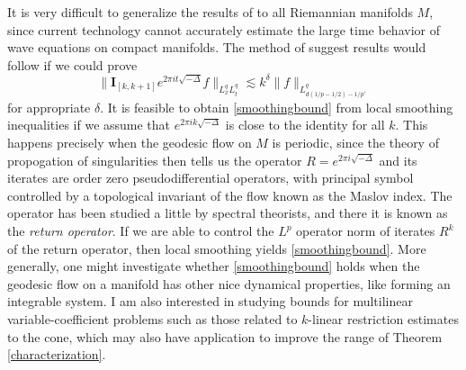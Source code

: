 \documentclass[11pt]{article}
\theoremstyle{definition}
\begin{document}

It is very difficult to generalize the results of \cite{DensonCharacterization} to all Riemannian manifolds $M$, since current technology cannot accurately estimate the large time behavior of wave equations on compact manifolds. The method of \cite{DensonCharacterization} suggest results would follow if we could prove
%
\begin{equation} \label{smoothingbound}
    \| \mathbf{I}_{[k,k+1]} e^{2 \pi i t \sqrt{-\Delta}} f \|_{L^q_x L^q_t} \lesssim k^\delta \| f \|_{L^q_{d(1/p - 1/2) - 1/p'}}
\end{equation}
%
for appropriate $\delta$. It is feasible to obtain \eqref{smoothingbound} from local smoothing inequalities if we assume that $e^{2 \pi i k \sqrt{-\Delta}}$ is close to the identity for all $k$. This happens precisely when the geodesic flow on $M$ is periodic, since the theory of propogation of singularities then tells us the operator $R = e^{2 \pi i \sqrt{-\Delta}}$ and its iterates are order zero pseudodifferential operators, with principal symbol controlled by a topological invariant of the flow known as the Maslov index. The operator has been studied a little by spectral theorists, and there it is known as the \emph{return operator}. If we are able to control the $L^p$ operator norm of iterates $R^k$ of the return operator, then local smoothing yields \eqref{smoothingbound}. More generally, one might investigate whether \eqref{smoothingbound} holds when the geodesic flow on a manifold has other nice dynamical properties, like forming an integrable system. I am also interested in studying bounds for multilinear variable-coefficient problems such as those related to $k$-linear restriction estimates to the cone, which may also have application to improve the range of Theorem \ref{characterization}.
\end{document}
